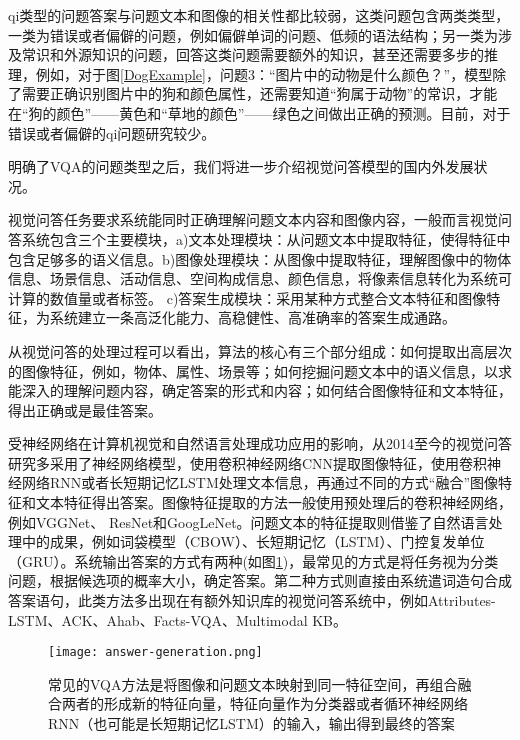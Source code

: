 qi类型的问题答案与问题文本和图像的相关性都比较弱，这类问题包含两类类型，一类为错误或者偏僻的问题，例如偏僻单词的问题、低频的语法结构；另一类为涉及常识和外源知识的问题，回答这类问题需要额外的知识，甚至还需要多步的推理，例如，对于图\ref{DogExample}，问题3：“图片中的动物是什么颜色？”，模型除了需要正确识别图片中的狗和颜色属性，还需要知道“狗属于动物”的常识，才能在“狗的颜色”——黄色和“草地的颜色”——绿色之间做出正确的预测。目前，对于错误或者偏僻的qi问题研究较少。

明确了VQA的问题类型之后，我们将进一步介绍视觉问答模型的国内外发展状况。

视觉问答任务要求系统能同时正确理解问题文本内容和图像内容，一般而言视觉问答系统包含三个主要模块，a)文本处理模块：从问题文本中提取特征，使得特征中包含足够多的语义信息。b)图像处理模块：从图像中提取特征，理解图像中的物体信息、场景信息、活动信息、空间构成信息、颜色信息，将像素信息转化为系统可计算的数值量或者标签。 c)答案生成模块：采用某种方式整合文本特征和图像特征，为系统建立一条高泛化能力、高稳健性、高准确率的答案生成通路。

从视觉问答的处理过程可以看出，算法的核心有三个部分组成：如何提取出高层次的图像特征，例如，物体、属性、场景等；如何挖掘问题文本中的语义信息，以求能深入的理解问题内容，确定答案的形式和内容；如何结合图像特征和文本特征，得出正确或是最佳答案。

受神经网络在计算机视觉和自然语言处理成功应用的影响，从2014至今的视觉问答研究多采用了神经网络模型，使用卷积神经网络CNN提取图像特征，使用卷积神经网络RNN或者长短期记忆LSTM处理文本信息，再通过不同的方式“融合”图像特征和文本特征得出答案。图像特征提取的方法一般使用预处理后的卷积神经网络，例如VGGNet、 ResNet和GoogLeNet。问题文本的特征提取则借鉴了自然语言处理中的成果，例如词袋模型（CBOW）、长短期记忆（LSTM）、门控复发单位（GRU）。系统输出答案的方式有两种(如图\ref{answer-generation})，最常见的方式是将任务视为分类问题，根据候选项的概率大小，确定答案。第二种方式则直接由系统遣词造句合成答案语句，此类方法多出现在有额外知识库的视觉问答系统中，例如Attributes-LSTM、ACK、Ahab、Facts-VQA、Multimodal KB。
\begin{figure}[H]
	\centering
	\texttt{[image: answer-generation.png]}
	\caption{常见的VQA方法是将图像和问题文本映射到同一特征空间，再组合融合两者的形成新的特征向量，特征向量作为分类器或者循环神经网络RNN（也可能是长短期记忆LSTM）的输入，输出得到最终的答案}
	\label{answer-generation}
\end{figure}

